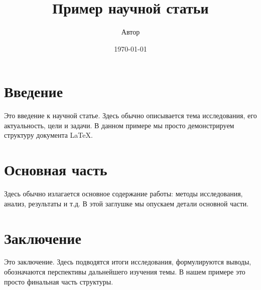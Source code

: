 \documentclass{article}
\title{Пример научной статьи}
\author{Автор}
\date{\today}
\begin{document}
\maketitle

\section{Введение}
Это введение к научной статье. Здесь обычно описывается тема исследования, его актуальность, цели и задачи. В данном примере мы просто демонстрируем структуру документа \LaTeX.

\section{Основная часть}
Здесь обычно излагается основное содержание работы: методы исследования, анализ, результаты и т.д. В этой заглушке мы опускаем детали основной части.

\section{Заключение}
Это заключение. Здесь подводятся итоги исследования, формулируются выводы, обозначаются перспективы дальнейшего изучения темы. В нашем примере это просто финальная часть структуры.
\end{document}
